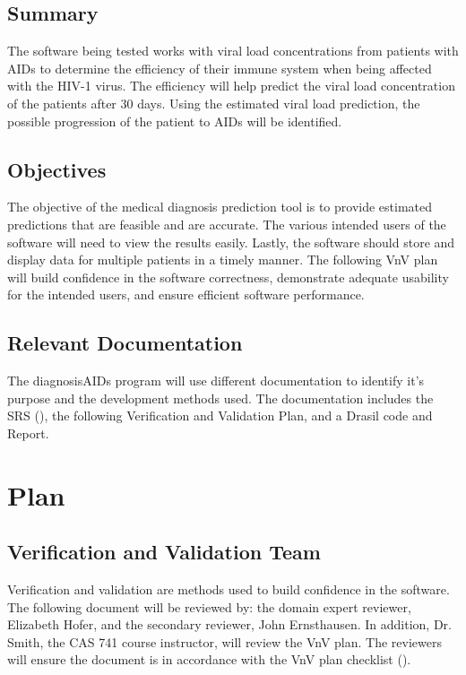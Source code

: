 \documentclass[12pt, titlepage]{article}
\begin{document}
\subsection{Summary}

The software being tested works with viral load concentrations from patients 
with  AIDs to determine the efficiency of their immune system when being 
affected with the HIV-1 virus. The efficiency will help predict the viral load 
concentration of the patients after 30 days. Using the estimated viral load 
prediction, the possible progression of the patient to AIDs will be identified.

\subsection{Objectives}

The objective of the medical diagnosis prediction tool is to provide estimated 
predictions that are feasible and are accurate. The various intended users of 
the software will need to view the results easily. Lastly, the software should 
store and display data for multiple patients in a timely manner. The following 
VnV plan will build confidence in the software correctness, demonstrate adequate 
usability for the intended users, and ensure efficient software performance.

\subsection{Relevant Documentation}

The diagnosisAIDs program will use different documentation to identify it's 
purpose and the development methods used. The documentation includes the SRS (\citet{SRS}), the following Verification and Validation Plan, and a Drasil code and Report.



\section{Plan}
	
\subsection{Verification and Validation Team}

Verification and validation are methods used to build confidence in the 
software. The following document will be reviewed by: the domain expert 
reviewer, Elizabeth Hofer, and the secondary reviewer, John Ernsthausen. In 
addition, Dr. Smith, the CAS 741 course instructor, will review the VnV plan. 
The reviewers will ensure the document is in accordance with the VnV plan 
checklist (\citet{Vnvchecklist}). 
\end{document}
